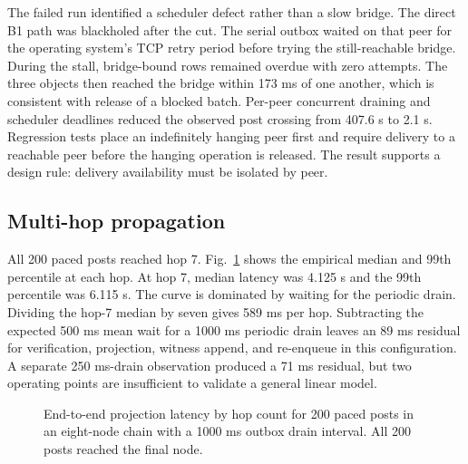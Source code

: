 \documentclass[conference,a4paper]{IEEEtran}
\begin{document}
The failed run identified a scheduler defect rather than a slow bridge. The direct B1 path was
blackholed after the cut. The serial outbox waited on that peer for the operating system's TCP retry
period before trying the still-reachable bridge. During the stall, bridge-bound rows remained overdue
with zero attempts. The three objects then reached the bridge within 173 ms of one another, which is
consistent with release of a blocked batch. Per-peer concurrent draining and scheduler deadlines
reduced the observed post crossing from 407.6 s to 2.1 s. Regression tests place an indefinitely
hanging peer first and require delivery to a reachable peer before the hanging operation is released.
The result supports a design rule: delivery availability must be isolated by peer.

\subsection{Multi-hop propagation}

All 200 paced posts reached hop 7. Fig.~\ref{fig:latency} shows the empirical median and 99th
percentile at each hop. At hop 7, median latency was 4.125 s and the 99th percentile was 6.115 s. The
curve is dominated by waiting for the periodic drain. Dividing the hop-7 median by seven gives 589 ms
per hop. Subtracting the expected 500 ms mean wait for a 1000 ms periodic drain leaves an 89 ms
residual for verification, projection, witness append, and re-enqueue in this configuration. A
separate 250 ms-drain observation produced a 71 ms residual, but two operating points are
insufficient to validate a general linear model.

\begin{figure}[t]
\centering
{}
\caption{End-to-end projection latency by hop count for 200 paced posts in an eight-node chain with
a 1000 ms outbox drain interval. All 200 posts reached the final node.}
\label{fig:latency}
\end{figure}
\end{document}
